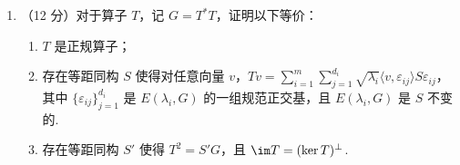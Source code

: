 \begin{enumerate}
    \item （12 分）对于算子 $T$，记 $G=T^*T$，证明以下等价：
    \begin{enumerate}
        \item $T$ 是正规算子；
        \item 存在等距同构 $S$ 使得对任意向量 $v$，$Tv=\displaystyle\sum_{i=1}^m\displaystyle\sum_{j=1}^{d_i}\sqrt{\lambda_i}\langle v,\varepsilon_{ij}\rangle S\varepsilon_{ij}$，其中 $\{\varepsilon_{ij}\}_{j=1}^{d_i}$ 是 $E(\lambda_i,G)$ 的一组规范正交基，且 $E(\lambda_i,G)$ 是 $S$ 不变的.
        \item 存在等距同构 $S'$ 使得 $T^2=S'G$，且 $\im T = (\ker T)^\perp$.
    \end{enumerate}
\end{enumerate}

\clearpage
